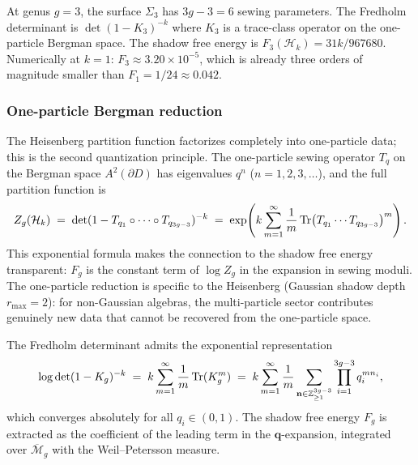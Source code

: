 \begin{example}[Genus $3$]
At genus $g = 3$, the surface $\Sigma_3$ has $3g - 3 = 6$ sewing parameters. The Fredholm determinant is $\det(1 - K_3)^{-k}$ where $K_3$ is a trace-class operator on the one-particle Bergman space. The shadow free energy is $F_3(\mathcal{H}_k) = 31k/967680$. Numerically at $k = 1$: $F_3 \approx 3.20 \times 10^{-5}$, which is already three orders of magnitude smaller than $F_1 = 1/24 \approx 0.042$.
\end{example}

\subsubsection{One-particle Bergman reduction}

\begin{remark}
The Heisenberg partition function factorizes completely into one-particle data; this is the second quantization principle. The one-particle sewing operator $T_q$ on the Bergman space $A^2(\partial D)$ has eigenvalues $q^n$ ($n = 1, 2, 3, \ldots$), and the full partition function is
\[
Z_g(\mathcal{H}_k) \;=\; \det(1 - T_{q_1} \circ \cdots \circ T_{q_{3g-3}})^{-k} \;=\; \exp\!\left( k \sum_{m=1}^{\infty} \frac{1}{m} \operatorname{Tr}\bigl(T_{q_1} \cdots T_{q_{3g-3}}\bigr)^m \right).
\]
This exponential formula makes the connection to the shadow free energy transparent: $F_g$ is the constant term of $\log Z_g$ in the expansion in sewing moduli. The one-particle reduction is specific to the Heisenberg (Gaussian shadow depth $r_{\max} = 2$): for non-Gaussian algebras, the multi-particle sector contributes genuinely new data that cannot be recovered from the one-particle space.
\end{remark}

\begin{proposition}
The Fredholm determinant admits the exponential representation
\begin{equation}%
\log \det(1 - K_g)^{-k} \;=\; k \sum_{m=1}^\infty \frac{1}{m} \Tr(K_g^m) \;=\; k \sum_{m=1}^\infty \frac{1}{m} \sum_{\mathbf{n} \in \mathbb{Z}_{\geq 1}^{3g-3}} \prod_{i=1}^{3g-3} q_i^{m n_i},
\end{equation}
which converges absolutely for all $q_i \in (0,1)$. The shadow free energy $F_g$ is extracted as the coefficient of the leading term in the $\mathbf{q}$-expansion, integrated over $\overline{\mathcal{M}}_g$ with the Weil--Petersson measure.
\end{proposition}

